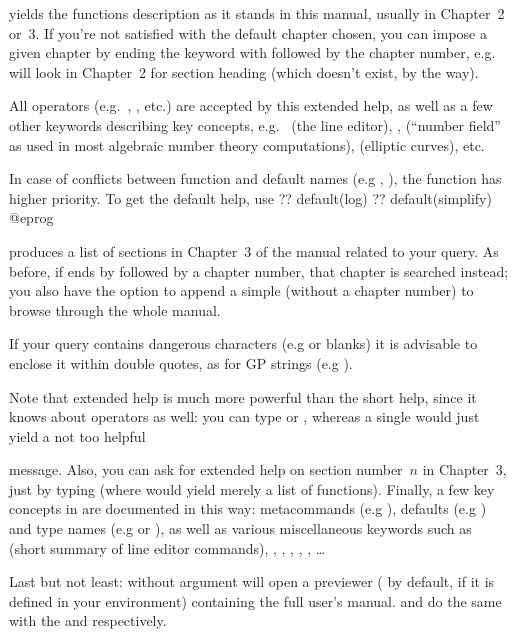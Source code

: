  yields the functions description as it stands in this
manual, usually in Chapter~2 or~3. If you're not satisfied with the default
chapter chosen, you can impose a given chapter by ending the keyword with
 followed by the chapter number, e.g.~ will look in
Chapter~2 for section heading  (which doesn't exist, by the way).

All operators (e.g.~\kbd{+}, \kbd{\&\&}, etc.) are accepted by this
extended help, as well as a few other keywords describing key  concepts,
e.g.~ (the line editor), ,  (``number
field'' as used in most algebraic number theory computations), 
(elliptic curves), etc.

In case of conflicts between function and default names (e.g ,
), the function has higher priority. To get the default help,
use 
\bprog
  ?? default(log)
  ?? default(simplify)
@eprog

 produces a list of sections in Chapter~3 of the
manual related to your query. As before, if  ends by 
followed by a chapter number, that chapter is searched instead; you also
have the option to append a simple  (without a chapter number) to
browse through the whole manual.

If your query contains dangerous characters (e.g  or blanks) it is
advisable to enclose it within double quotes, as for GP strings (e.g
).

Note that extended help is much more powerful than the short help, since
it knows about operators as well: you can type  or
, whereas a single  would just yield a not too helpful


\noindent message. Also, you can ask for extended help on section
number~$n$ in Chapter~3, just by typing  (where  would
yield merely a list of functions). Finally, a few key concepts in  are
documented in this way: metacommands (e.g ), defaults (e.g
) and type names (e.g  or ), as well as
various miscellaneous keywords such as  (short summary of line
editor commands), , , ,
, , \dots

Last but not least:  without argument will open a 
previewer ( by default,  if it is defined in your
environment) containing the full user's manual.  and
 do the same with the  and 
respectively.

